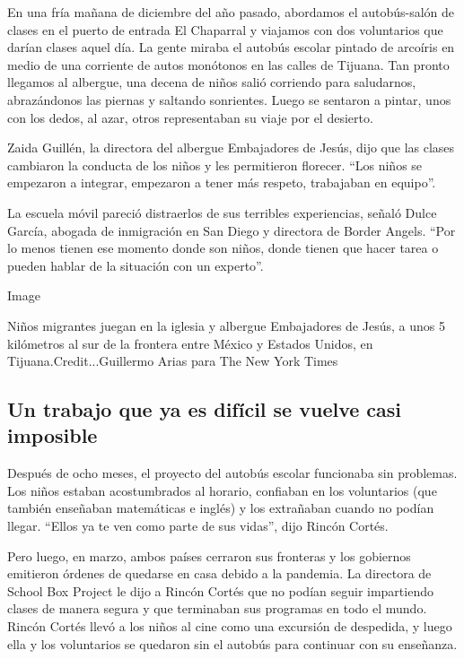 En una fría mañana de diciembre del año pasado, abordamos el
autobús-salón de clases en el puerto de entrada El Chaparral y viajamos
con dos voluntarios que darían clases aquel día. La gente miraba el
autobús escolar pintado de arcoíris en medio de una corriente de autos
monótonos en las calles de Tijuana. Tan pronto llegamos al albergue, una
decena de niños salió corriendo para saludarnos, abrazándonos las
piernas y saltando sonrientes. Luego se sentaron a pintar, unos con los
dedos, al azar, otros representaban su viaje por el desierto.

Zaida Guillén, la directora del albergue Embajadores de Jesús, dijo que
las clases cambiaron la conducta de los niños y les permitieron
florecer. ``Los niños se empezaron a integrar, empezaron a tener más
respeto, trabajaban en equipo''.

La escuela móvil pareció distraerlos de sus terribles experiencias,
señaló Dulce García, abogada de inmigración en San Diego y directora de
Border Angels. ``Por lo menos tienen ese momento donde son niños, donde
tienen que hacer tarea o pueden hablar de la situación con un experto''.

Image

Niños migrantes juegan en la iglesia y albergue Embajadores de Jesús, a
unos 5 kilómetros al sur de la frontera entre México y Estados Unidos,
en Tijuana.Credit...Guillermo Arias para The New York Times

\hypertarget{un-trabajo-que-ya-es-difuxedcil-se-vuelve-casi-imposible}{%
\subsection{Un trabajo que ya es difícil se vuelve casi
imposible}\label{un-trabajo-que-ya-es-difuxedcil-se-vuelve-casi-imposible}}

Después de ocho meses, el proyecto del autobús escolar funcionaba sin
problemas. Los niños estaban acostumbrados al horario, confiaban en los
voluntarios (que también enseñaban matemáticas e inglés) y los
extrañaban cuando no podían llegar. ``Ellos ya te ven como parte de sus
vidas'', dijo Rincón Cortés.

Pero luego, en marzo, ambos países cerraron sus fronteras y los
gobiernos emitieron órdenes de quedarse en casa debido a la pandemia. La
directora de School Box Project le dijo a Rincón Cortés que no podían
seguir impartiendo clases de manera segura y que terminaban sus
programas en todo el mundo. Rincón Cortés llevó a los niños al cine como
una excursión de despedida, y luego ella y los voluntarios se quedaron
sin el autobús para continuar con su enseñanza.

